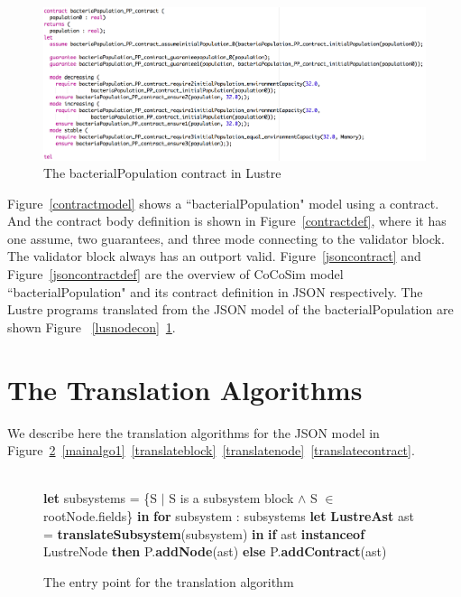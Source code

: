 \documentclass{article}
\begin{document}
\begin{figure}[h]
\begin{center}
  \includegraphics[scale=0.3]{figures/luscon}    
\end{center}  
  \caption{The bacterialPopulation contract in Lustre}
  \label{luscon}
\end{figure}

Figure~\ref{contractmodel} shows a ``bacterialPopulation" model using a contract. 
And the contract body definition is shown in Figure~\ref{contractdef}, where it has one assume, two guarantees, and three mode connecting to the validator block. 
The validator block always has an outport valid. 
Figure~\ref{jsoncontract} and Figure~\ref{jsoncontractdef} are the overview of CoCoSim model \textsf{``bacterialPopulation"} and its contract definition in JSON respectively. 
The Lustre programs translated from the JSON model of the bacterialPopulation are shown Figure ~\ref{lusnodecon}~\ref{luscon}.





\section{The Translation Algorithms}

We describe here the translation algorithms for the JSON model in Figure~\ref{mainalgo}~\ref{mainalgo1}~\ref{translateblock}~\ref{translatenode}~\ref{translatecontract}.


\begin{figure}
\begin{algorithmic}
\\
\State \textbf{let} subsystems = \{S $\mid$ S is a subsystem block $\land$ S $\in$ rootNode.fields\} \textbf{in}
\State \textbf{for} subsystem : subsystems
\State {\ \ \ \ } \textbf{let} \textbf{LustreAst} ast = \textbf{translateSubsystem}(subsystem) \textbf{in}
\State {\ \ \ \ } \textbf{if}  ast \textbf{instanceof} LustreNode \textbf{then}
\State {\ \ \ \ \ \ \ \ } P.\textbf{addNode}(ast)
\State {\ \ \ \ } \textbf{else}
\State {\ \ \ \ \ \ \ \ } P.\textbf{addContract}(ast)
\EndFunction
\end{algorithmic}
\label{mainalgo}
\caption{The entry point for the translation algorithm}
\end{figure}
\end{document}
